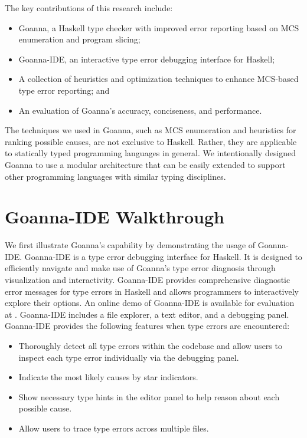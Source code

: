     The key contributions of this research include:
    \begin{itemize}
        \item Goanna, a Haskell type checker with improved error reporting based on MCS enumeration and program slicing;
        \item Goanna-IDE, an interactive type error debugging interface for Haskell; 
        \item A collection of heuristics and optimization techniques to enhance MCS-based type error reporting; and
        \item An evaluation of Goanna's accuracy, conciseness, and performance.
    \end{itemize}

  The techniques we used in Goanna, such as MCS enumeration and heuristics for ranking possible causes, are not exclusive to Haskell. Rather, they are applicable to statically typed programming languages in general. We intentionally designed Goanna to use a modular architecture that can be easily extended to support other programming languages with similar typing disciplines.


    \section{Goanna-IDE Walkthrough} \label{walkthrough}
    We first illustrate Goanna's capability by demonstrating the usage of Goanna-IDE. Goanna-IDE is a type error debugging interface for Haskell. It is designed to efficiently navigate and make use of Goanna's type error diagnosis through visualization and interactivity. Goanna-IDE provides comprehensive diagnostic error messages for type errors in Haskell and allows programmers to interactively explore their options. An online demo of Goanna-IDE is available for evaluation at \cite{Anonymous2023-bo}. Goanna-IDE includes a file explorer, a text editor, and a debugging panel. Goanna-IDE provides the following features when type errors are encountered:

    \begin{itemize}
        \item Thoroughly detect all type errors within the codebase and allow users to inspect each type error individually via the debugging panel.
        \item Indicate the most likely causes by star indicators.
        \item Show necessary type hints in the editor panel to help reason about each possible cause.
        \item Allow users to trace type errors across multiple files.
    \end{itemize}

